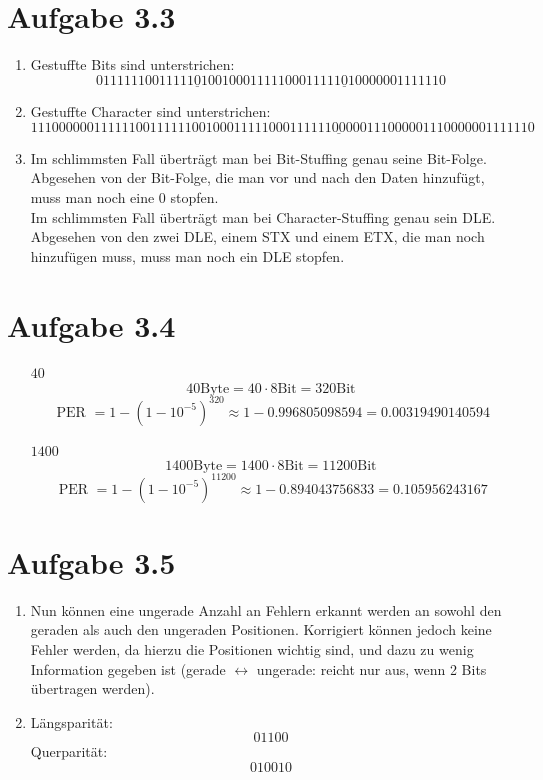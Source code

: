 \documentclass[12pt, a4paper]{article}
\begin{document}
\section*{Aufgabe 3.3}
\begin{enumerate}[label=\alph*)]
	\item	Gestuffte Bits sind unterstrichen:
			$$01111110 011111\underline{0}10 01000111 11000111 11\underline{0}100000 01111110$$
	
	\item	Gestuffte Character sind unterstrichen:
			$$11100000 01111110 01111110 01000111 11000111 \underline{11100000} 11100000 11100000 01111110$$
	
	\item	Im schlimmsten Fall überträgt man bei Bit-Stuffing genau seine Bit-Folge. Abgesehen von der Bit-Folge, die man vor und nach den Daten hinzufügt, muss man noch eine 0 stopfen.\\
			Im schlimmsten Fall überträgt man bei Character-Stuffing genau sein DLE. Abgesehen von den zwei DLE, einem STX und einem ETX, die man noch hinzufügen muss, muss man noch ein DLE stopfen.
\end{enumerate}

\newpage

\section*{Aufgabe 3.4}
\begin{itemize}
	\item[$40$]		$$40 \text{Byte} = 40 \cdot 8 \text{Bit} = 320 \text{Bit}$$
					$$\text{ PER } = 1 - (1-10^{-5})^{320} \approx 1 - 0.996805098594 = 0.00319490140594$$
	
	\item[$1400$]	$$1400 \text{Byte} = 1400 \cdot 8 \text{Bit} = 11200 \text{Bit}$$
					$$\text{ PER } = 1 - (1-10^{-5})^{11200} \approx 1 - 0.894043756833 = 0.105956243167$$
\end{itemize}



\section*{Aufgabe 3.5}
\begin{enumerate}[label=\alph*)]
	\item	Nun können eine ungerade Anzahl an Fehlern erkannt werden an sowohl den geraden als auch den ungeraden Positionen. Korrigiert können jedoch keine Fehler werden, da hierzu die Positionen wichtig sind, und dazu zu wenig Information gegeben ist (gerade $\leftrightarrow$ ungerade: reicht nur aus, wenn 2 Bits übertragen werden).
	
	\item	Längsparität:
			$$01100$$
			Querparität:
			$$010010$$
\end{enumerate}
\end{document}
